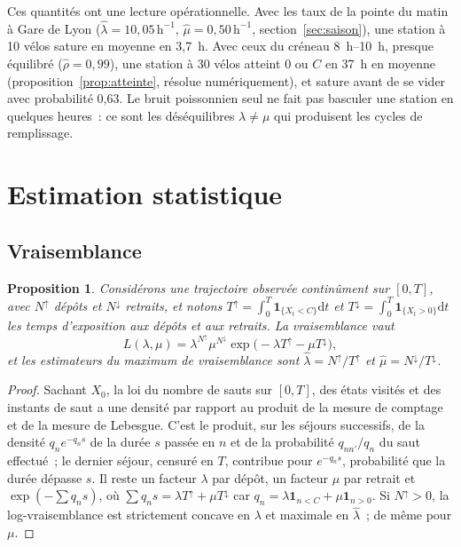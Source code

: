 \documentclass[10pt,a4paper,twocolumn]{article}
\theoremstyle{enonce}
\newtheorem{proposition}[theoreme]{Proposition}
\theoremstyle{defi}
\newcommand{\dd}{\mathrm{d}}
\newcommand{\un}{\mathbf{1}}
\newcommand{\hr}{\,\mathrm{h}^{-1}}
\newcommand{\Nu}{N^{\uparrow}}
\newcommand{\Nd}{N^{\downarrow}}
\newcommand{\Tu}{T^{\uparrow}}
\newcommand{\Td}{T^{\downarrow}}
\begin{document}
Ces quantités ont une lecture opérationnelle. Avec les taux de la pointe du matin à Gare de Lyon ($\hat\lambda=10{,}05\hr$, $\hat\mu=0{,}50\hr$, section~\ref{sec:saison}), une station à 10 vélos sature en moyenne en 3{,}7~h. Avec ceux du créneau 8~h--10~h, presque équilibré ($\hat\rho=0{,}99$), une station à 30 vélos atteint $0$ ou $C$ en 37~h en moyenne (proposition~\ref{prop:atteinte}, résolue numériquement), et sature avant de se vider avec probabilité 0{,}63. Le bruit poissonnien seul ne fait pas basculer une station en quelques heures~: ce sont les déséquilibres $\lambda\neq\mu$ qui produisent les cycles de remplissage.

\section{Estimation statistique}\label{sec:estimation}

\subsection{Vraisemblance}

\begin{proposition}\label{prop:emv}
Considérons une trajectoire observée continûment sur $[0,T]$, avec $\Nu$ dépôts et $\Nd$ retraits, et notons $\Tu=\int_0^T\un_{\{X_t<C\}}\dd t$ et $\Td=\int_0^T\un_{\{X_t>0\}}\dd t$ les temps d'exposition aux dépôts et aux retraits. La vraisemblance vaut
\[
L(\lambda,\mu)=\lambda^{\Nu}\mu^{\Nd}\exp\big(-\lambda\Tu-\mu\Td\big),
\]
et les estimateurs du maximum de vraisemblance sont $\hat\lambda=\Nu/\Tu$ et $\hat\mu=\Nd/\Td$.
\end{proposition}

\begin{proof}
Sachant $X_0$, la loi du nombre de sauts sur $[0,T]$, des états visités et des instants de saut a une densité par rapport au produit de la mesure de comptage et de la mesure de Lebesgue. C'est le produit, sur les séjours successifs, de la densité $q_ne^{-q_ns}$ de la durée $s$ passée en $n$ et de la probabilité $q_{nn'}/q_n$ du saut effectué~; le dernier séjour, censuré en $T$, contribue pour $e^{-q_ns}$, probabilité que la durée dépasse $s$. Il reste un facteur $\lambda$ par dépôt, un facteur $\mu$ par retrait et $\exp(-\sum q_ns)$, où $\sum q_ns=\lambda\Tu+\mu\Td$ car $q_n=\lambda\un_{n<C}+\mu\un_{n>0}$. Si $\Nu>0$, la log-vraisemblance est strictement concave en $\lambda$ et maximale en $\hat\lambda$~; de même pour $\mu$.
\end{proof}
\end{document}
